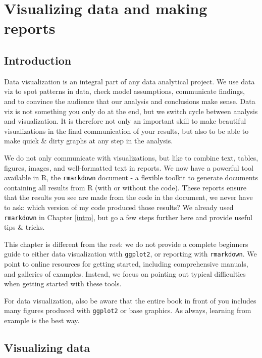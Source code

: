 \documentclass[]{book}
\begin{document}
\hypertarget{reporting}{%
\chapter{Visualizing data and making reports}\label{reporting}}

\hypertarget{introduction-1}{%
\section{Introduction}\label{introduction-1}}

Data visualization is an integral part of any data analytical project. We use data viz to spot patterns in data, check model assumptions, communicate findings, and to convince the audience that our analysis and conclusions make sense. Data viz is not something you only do at the end, but we switch cycle between analysis and visualization. It is therefore not only an important skill to make beautiful visualizations in the final communication of your results, but also to be able to make quick \& dirty graphs at any step in the analysis.

We do not only communicate with visualizations, but like to combine text, tables, figures, images, and well-formatted text in reports. We now have a powerful tool available in R, the \texttt{rmarkdown} document - a flexible toolkit to generate documents containing all results from R (with or without the code). These reports ensure that the results you see are made from the code in the document, we never have to ask: which version of my code produced those results? We already used \texttt{rmarkdown} in Chapter \ref{intro}, but go a few steps further here and provide useful tips \& tricks.

This chapter is different from the rest: we do not provide a complete beginners guide to either data visualization with \texttt{ggplot2}, or reporting with \texttt{rmarkdown}. We point to online resources for getting started, including comprehensive manuals, and galleries of examples. Instead, we focus on pointing out typical difficulties when getting started with these tools.

For data visualization, also be aware that the entire book in front of you includes many figures produced with \texttt{ggplot2} or base graphics. As always, learning from example is the best way.

\hypertarget{visualizing}{%
\section{Visualizing data}\label{visualizing}}
\end{document}
